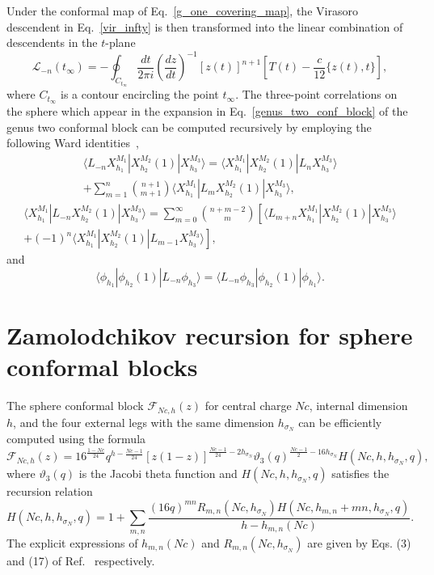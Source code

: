 \documentclass[a4paper,11pt]{article}
\begin{document}
Under the conformal map of
Eq.~\eqref{g_one_covering_map}, the Virasoro descendent in Eq.~\eqref{vir_infty}
is then transformed into the linear combination of descendents in the $t$-plane
\begin{equation}\label{Virasoro_transf}
 \mathcal{L}_{-n}(t_{\infty})=-\oint_{C_{t_{\infty}}}\frac{dt}{2\pi i}
 \left(\frac{dz}{dt}\right)^{-1}[z(t)]^{n+1}
 \left[T(t)-\frac{c}{12}\{z(t), t\}\right],
\end{equation}
where $C_{t_{\infty}}$ is a contour encircling the point $t_{\infty}$.
The three-point correlations on the sphere which appear 
in the expansion in Eq.~\eqref{genus_two_conf_block} of the genus two conformal block can be 
computed recursively by employing the following Ward identities~\cite{Teschner},
\begin{multline}
 \langle L_{-n}X_{h_1}^{M_1}|X_{h_2}^{M_2}(1)|X_{h_3}^{M_3}\rangle=
 \langle X_{h_1}^{M_1}|X_{h_2}^{M_2}(1)|L_n X_{h_3}^{M_3}\rangle \\
 +\sum_{m= 1}^n \binom{n+1}{m+1}\langle X_{h_1}^{M_1}|L_m X_{h_2}^{M_2}(1)|X_{h_3}^{M_3}\rangle,
\end{multline}
\begin{multline}
 \langle X_{h_1}^{M_1}|L_{-n}X_{h_2}^{M_2}(1)|X_{h_3}^{M_3}\rangle=
 \sum_{m=0}^\infty\binom{n+m-2}{m}
 \left[\langle L_{m+n} X_{h_1}^{M_1}|X_{h_2}^{M_2}(1)|X_{h_3}^{M_3}\rangle \right.\\ +
 \left. (-1)^n\langle X_{h_1}^{M_1}|X_{h_2}^{M_2}(1)|L_{m-1} X_{h_3}^{M_3}\rangle\right],
\end{multline}
and
\begin{equation}
 \langle \phi_{h_1}|\phi_{h_2}(1)|L_{-n}\phi_{h_3}\rangle=
 \langle L_{-n}\phi_{h_3}|\phi_{h_2}(1)|\phi_{h_1}\rangle.
\end{equation}





\section{Zamolodchikov recursion for sphere conformal blocks}\label{app_zamolodchikov}
The sphere conformal block $\mathcal{F}_{Nc, h}(z)$
for central charge $Nc$, internal dimension $h$, and the four
external legs with the same dimension $h_{\sigma_N}$ can be efficiently computed 
using the formula \cite{Zamolodchikov}
\begin{equation}
 \mathcal{F}_{Nc, h}(z)=
 16^{\frac{1-Nc}{24}}q^{h-\frac{Nc-1}{24}}
 [z(1-z)]^{\frac{Nc-1}{24}-2h_{\sigma_N}}
 \vartheta_3(q)^{\frac{Nc-1}{2}-16h_{\sigma_N}}H(Nc, h, h_{\sigma_N}, q),
\end{equation}
where $\vartheta_3(q)$ is the Jacobi theta function and $H(Nc, h, h_{\sigma_N}, q)$
satisfies the recursion relation 
\begin{equation}
 H(Nc, h, h_{\sigma_N}, q)=
 1+\sum_{m, n}\frac{(16q)^{mn}R_{m,n}(Nc, h_{\sigma_N})H(Nc, h_{m,n}+mn, h_{\sigma_N}, q)}
 {h-h_{m,n}(Nc)}.
\end{equation}
The explicit expressions of $h_{m,n}(Nc)$ and $R_{m, n}(Nc, h_{\sigma_N})$
are given by Eqs. (3) and (17) of Ref.~\cite{Zamolodchikov} respectively.  
\end{document}
